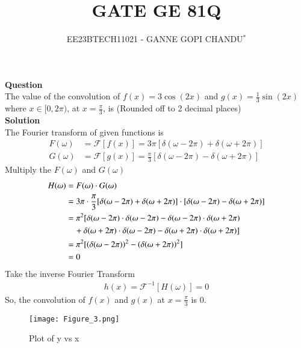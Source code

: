 \documentclass[journal,12pt,onecolumn]{IEEEtran}
\theoremstyle{remark}
\begin{document}

\vspace{3cm}
\title{GATE GE 81Q}
\author{EE23BTECH11021 - GANNE GOPI CHANDU$^{*}$%
}
\maketitle
\bigskip
\renewcommand{\thefigure}{\theenumi}
\renewcommand{\thetable}{\theenumi}

\textbf{Question}\\
The value of the convolution of $f(x) = 3\cos(2x)$ and $g(x) = \frac{1}{3}\sin(2x)$ where $x \in [0, 2\pi)$, at $x = \frac{\pi}{3}$, is (Rounded off to 2 decimal places)\\
\textbf{Solution}\\
The Fourier transform of given functions is
 \begin{align}
        F(\omega) &= \mathcal{F}[f(x)] = 3{\pi}[\delta(\omega - 2\pi) + \delta(\omega + 2\pi)] \\
        G(\omega) &= \mathcal{F}[g(x)] = \frac{\pi}{3}[\delta(\omega - 2\pi) - \delta(\omega + 2\pi)]
 \end{align}
Multiply the $F(\omega)$ and $G(\omega)$
\begin{align}
        H(\omega) &= F(\omega) \cdot G(\omega) \\
        &= 3{\pi} \cdot \frac{\pi}{3}[\delta(\omega - 2\pi) + \delta(\omega + 2\pi)] \cdot [\delta(\omega - 2\pi) - \delta(\omega + 2\pi)] \\
        &= {\pi}^2[\delta(\omega - 2\pi) \cdot \delta(\omega - 2\pi) - \delta(\omega - 2\pi) \cdot \delta(\omega + 2\pi) \\
        &\quad + \delta(\omega + 2\pi) \cdot \delta(\omega - 2\pi) - \delta(\omega + 2\pi) \cdot \delta(\omega + 2\pi)] \\
        &= {\pi}^2[\left(\delta(\omega - 2\pi)\right)^2 - \left(\delta(\omega + 2\pi)\right)^2]\\
        &=0
\end{align}
Take the inverse Fourier Transform
\begin{align}
     h(x) = \mathcal{F}^{-1}[H(\omega)] = 0
\end{align}
So, the convolution of \(f(x)\) and \(g(x)\) at \(x = \frac{\pi}{3}\) is $0$.
\begin{figure}
    \centering
    \texttt{[image: Figure\_3.png]}
    \caption{Plot of y vs x}
    \label{fig:2}
\end{figure}\\
\end{document}

